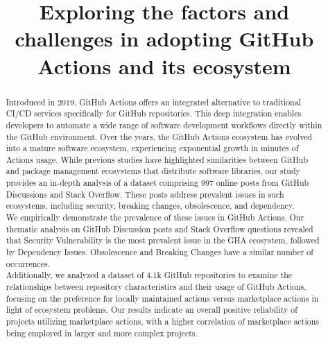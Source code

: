 \documentclass[conference]{IEEEtran}
\begin{document}
\title{Exploring the factors and challenges in adopting GitHub Actions and its ecosystem\\}

\author{
\and
{}
}

\maketitle

\begin{abstract}
  Introduced in 2019, GitHub Actions offers an integrated alternative to traditional CI/CD services specifically for GitHub repositories. This deep integration enables developers to automate a wide range of software development workflows directly within the GitHub environment. Over the years, the GitHub Actions ecosystem has evolved into a mature software ecosystem, experiencing exponential growth in minutes of Actions usage. While previous studies have highlighted similarities between GitHub and package management ecosystems that distribute software libraries, our study provides an in-depth analysis of a dataset comprising 997 online posts from GitHub Discussions and Stack Overflow. These posts address prevalent issues in such ecosystems, including security, breaking changes, obsolescence, and dependency. \\
  We empirically demonstrate the prevalence of these issues in GitHub Actions. Our thematic analysis on GitHub Discussion posts and Stack Overflow questions revealed that Security Vulnerability is the most prevalent issue in the GHA ecosystem, followed by Dependency Issues. Obsolescence and Breaking Changes have a similar number of occurrences. \\
   Additionally, we analyzed a dataset of 4.1k GitHub repositories to examine the relationships between repository characteristics and their usage of GitHub Actions, focusing on the preference for locally maintained actions versus marketplace actions in light of ecosystem problems. Our results indicate an overall positive reliability of projects utilizing marketplace actions, with a higher correlation of marketplace actions being employed in larger and more complex projects. \\ 
 \end{abstract}
\end{document}
